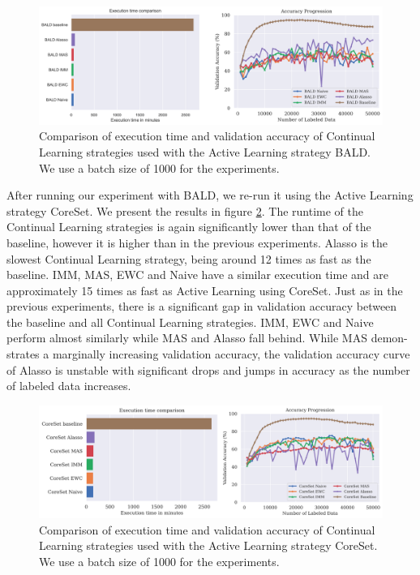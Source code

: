\begin{figure}[h]
    \centering
    \includegraphics[width=\linewidth]{images/results_CAL/Bald_CAL_1000b.png}
    \caption[Continual Active Learning BALD 1000 batch size]{Comparison of execution time and validation accuracy of Continual Learning strategies used with the Active Learning strategy BALD.
    We use a batch size of 1000 for the experiments.}
    \label{fig:Evaluation:Results:CAL:BALD1000}
\end{figure}

After running our experiment with BALD, we re-run it using the Active Learning strategy CoreSet. We present the results in figure \ref{fig:Evaluation:Results:CAL:CoreSet1000}. The runtime of the 
Continual Learning strategies is again significantly lower than that of the baseline, however it is higher than in the previous experiments. Alasso is the slowest Continual Learning strategy, being
around 12 times as fast as the baseline. IMM, MAS, EWC and Naive have a similar execution time and are approximately 15 times as fast as Active Learning using CoreSet. Just as in the previous experiments,
there is a significant gap in validation accuracy between the baseline and all Continual Learning strategies. IMM, EWC and Naive perform almost similarly while MAS and Alasso fall behind. While MAS demon-
strates a marginally increasing validation accuracy, the validation accuracy curve of Alasso is unstable with significant drops and jumps in accuracy as the number of labeled data increases. \par

\begin{figure}[h]
    \centering
    \includegraphics[width=\linewidth]{images/results_CAL/CoreSet_CAL_1000b.png}
    \caption[Continual Active Learning CoreSet 1000 batch size]{Comparison of execution time and validation accuracy of Continual Learning strategies used with the Active Learning strategy
     CoreSet. We use a batch size of 1000 for the experiments. }
    \label{fig:Evaluation:Results:CAL:CoreSet1000}
\end{figure}

